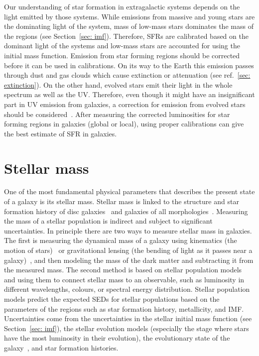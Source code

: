 Our understanding of star formation in extragalactic systems depends on the light emitted by those systems.
While emissions from massive and young stars are the dominating light of the system, mass of low-mass stars dominates the mass of the regions (see Section~\ref{sec: imf}).
Therefore, SFRs are calibrated based on the dominant light of the systems and low-mass stars are accounted for using the initial mass function.
Emission from star forming regions should be corrected before it can be used in calibrations.
On its way to the Earth this emission passes through dust and gas clouds which cause extinction or attenuation (see ref.~\ref{sec: extinction}).
On the other hand, evolved stars emit their light in the whole spectrum as well as the  UV. 
Therefore, even though it might have an insignificant part in UV emission from galaxies, a correction for emission from evolved stars should be considered~\citep{Leroy08}.
After measuring the corrected luminosities for star forming regions in galaxies (global or local), using proper calibrations can give the best estimate of SFR in galaxies. 





\section{Stellar mass}
\label{sec: starmass_intro}
One of the most fundamental physical parameters that describes the present state of a galaxy is its stellar mass. 
Stellar mass is linked to the structure and star formation history of disc galaxies~\citep{Gavvazi96} and  galaxies of all morphologies~\citep{Scodeggio02}. 
Measuring the mass of a stellar population is indirect and subject to significant uncertainties. 
In principle there are two ways to measure stellar mass in galaxies. 
The first is measuring the dynamical mass of a galaxy using kinematics (the motion of stars)~\citep{Cappellari06} or gravitational lensing (the bending of light as it passes near a galaxy)~\citep{Auger09}, and then modeling the mass of the dark matter and subtracting it from the measured mass. 
The second method is based on stellar population models~\citep[e.g.][]{Bruzual93, Kotulla09} and using them to connect stellar mass to an observable, such as luminosity in different wavelengths, colours, or spectral energy distribution. 
Stellar population models predict the expected SEDs for stellar populations based on the parameters of the regions such as star formation history, metallicity, and IMF.
Uncertainties come from the uncertainties in the stellar initial mass function (see Section~\ref{sec: imf}), the stellar evolution models (especially the stage where stars have the most luminosity in their evolution), the evolutionary state of the galaxy~\citep[see][and references therein]{Dalcanton12}, and star formation histories. 


